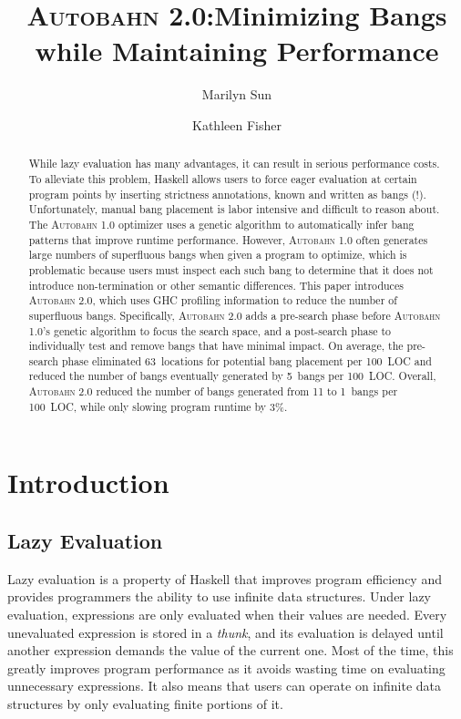 \documentclass[format=sigplan, review=true]{acmart}
\newcommand{\Ao}[0]{\textsc{Autobahn 1.0}}
\newcommand{\At}[0]{\textsc{Autobahn 2.0}}
\newcommand{\preopt}[0]{pre-search}
\newcommand{\postopt}[0]{post-search}
\begin{document}
\title{\At:\break Minimizing Bangs while Maintaining Performance}
\author{Marilyn Sun}
\author{Kathleen Fisher}
\begin{abstract}

While lazy evaluation has many advantages, it can result in serious
performance costs. To alleviate this problem, Haskell allows users to
force eager evaluation at certain program points by inserting
strictness annotations, known and written as bangs (!).
Unfortunately, manual bang placement
is labor intensive and difficult to reason about. The \Ao{}
optimizer uses a genetic algorithm to automatically infer bang patterns
that improve runtime performance. However, \Ao{} often generates
large numbers of superfluous bangs when given a program to optimize,
which is problematic because users must inspect each such bang to
determine that it does not introduce non-termination or other semantic
differences. 
This paper introduces \At, which uses GHC
profiling information to reduce the number of superfluous bangs.
Specifically,
\At{} adds a \preopt{} phase before \Ao's genetic algorithm
to focus the search space, and a \postopt{} phase to
individually test and remove bangs that have minimal impact. On average, the \preopt{}
phase eliminated 63~locations for potential bang
placement per 100~LOC and reduced the number of bangs eventually
generated by 5~bangs per 100~LOC. Overall, \At{} reduced the number of
bangs generated from 11 to 1~bangs per 100~LOC, while only
slowing program runtime by 3\%. 
\end{abstract}


\maketitle

\section{Introduction}

\subsection{Lazy Evaluation}

Lazy evaluation is a property of Haskell that improves program efficiency and provides programmers the ability to use infinite data structures. Under lazy evaluation, expressions are only evaluated when their values are needed. Every unevaluated expression is stored in a \textit{thunk}, and its evaluation is delayed until another expression demands the value of the current one. Most of the time, this greatly improves program performance as it avoids wasting time on evaluating unnecessary expressions. It also means that users can operate on infinite data structures by only evaluating finite portions of it.
\end{document}
